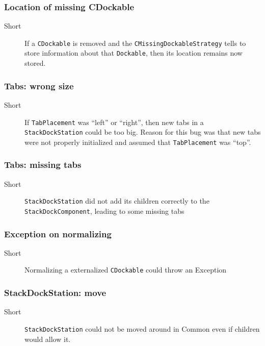 \documentclass[a4paper,10pt]{article}
\newcommand{\src}[1]{\lstinline[basicstyle=\normalsize\ttfamily,keywordstyle=\normalsize\ttfamily,identifierstyle=\normalsize\ttfamily]|#1|}
\newcommand{\short}{\item[Short]}
\begin{document}
\subsubsection{Location of missing CDockable}
\begin{description}
 \short If a \src{CDockable} is removed and the \src{CMissingDockableStrategy} tells to store information about that \src{Dockable}, then its location remains now stored.
\end{description}

\subsubsection{Tabs: wrong size}
\begin{description}
 \short If \src{TabPlacement} was ``left'' or ``right'', then new tabs in a \linebreak \src{StackDockStation} could be too big. Reason for this bug was that new tabs were not properly initialized and assumed that \src{TabPlacement} was ``top''.
\end{description}

\subsubsection{Tabs: missing tabs}
\begin{description}
 \short \src{StackDockStation} did not add its children correctly to the \linebreak \src{StackDockComponent}, leading to some missing tabs
\end{description}

\subsubsection{Exception on normalizing}
\begin{description}
 \short Normalizing a externalized \src{CDockable} could throw an Exception
\end{description}


\subsubsection{StackDockStation: move}
\begin{description}
 \short \src{StackDockStation} could not be moved around in Common even if children would allow it.
\end{description}
\end{document}
